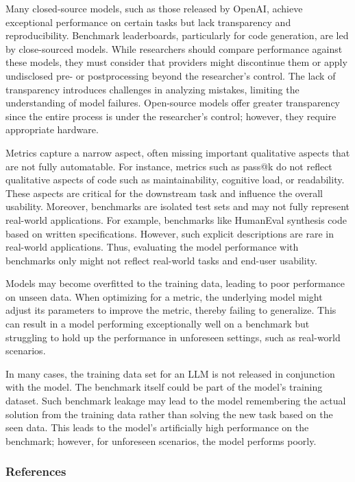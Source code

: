 \documentclass[11pt]{article}
\begin{document}
Many closed-source models, such as those released by OpenAI, achieve exceptional performance on certain tasks but lack transparency and reproducibility.
Benchmark leaderboards, particularly for code generation, are led by close-sourced models.
While researchers should compare performance against these models, they must consider that providers might discontinue them or apply undisclosed pre- or postprocessing beyond the researcher's control.
The lack of transparency introduces challenges in analyzing mistakes, limiting the understanding of model failures.
Open-source models offer greater transparency since the entire process is under the researcher's control; however, they require appropriate hardware.

Metrics capture a narrow aspect, often missing important qualitative aspects that are not fully automatable.
For instance, metrics such as pass@k do not reflect qualitative aspects of code such as maintainability, cognitive load, or readability.
These aspects are critical for the downstream task and influence the overall usability.
Moreover, benchmarks are isolated test sets and may not fully represent real-world applications.
For example, benchmarks like HumanEval synthesis code based on written specifications.
However, such explicit descriptions are rare in real-world applications.
Thus, evaluating the model performance with benchmarks only might not reflect real-world tasks and end-user usability.

Models may become overfitted to the training data, leading to poor performance on unseen data.
When optimizing for a metric, the underlying model might adjust its parameters to improve the metric, thereby failing to generalize.
This can result in a model performing exceptionally well on a benchmark but struggling to hold up the performance in unforeseen settings, such as real-world scenarios.

In many cases, the training data set for an LLM is not released in conjunction with the model.
The benchmark itself could be part of the model's training dataset.
Such benchmark leakage may lead to the model remembering the actual solution from the training data rather than solving the new task based on the seen data.
This leads to the model's artificially high performance on the benchmark; however, for unforeseen scenarios, the model performs poorly.

\subsubsection{References}



\end{document}

